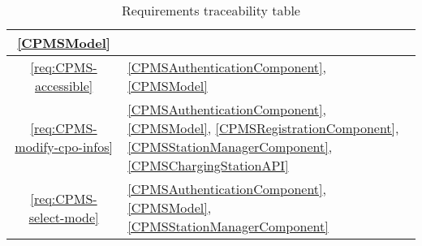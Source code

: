 \begin{table}[h]
\begin{center}
\begin{tabular}{|c||p{15.5cm}|}
            \ref{CPMSModel}
            \\
            \hline
            \ref{req:CPMS-accessible} &
            \ref{CPMSAuthenticationComponent},
            \ref{CPMSModel}
            \\
            \hline
            \ref{req:CPMS-modify-cpo-infos} &
            \ref{CPMSAuthenticationComponent},
            \ref{CPMSModel},
            \ref{CPMSRegistrationComponent},
            \ref{CPMSStationManagerComponent},
            \ref{CPMSChargingStationAPI}
            \\
            \hline
            \ref{req:CPMS-select-mode} &
            \ref{CPMSAuthenticationComponent},
            \ref{CPMSModel},
            \ref{CPMSStationManagerComponent}
            \\
            \hline
        \end{tabular}
    \end{center}
    \caption{Requirements traceability table}
    \label{requirements-traceability-table}
\end{table}



